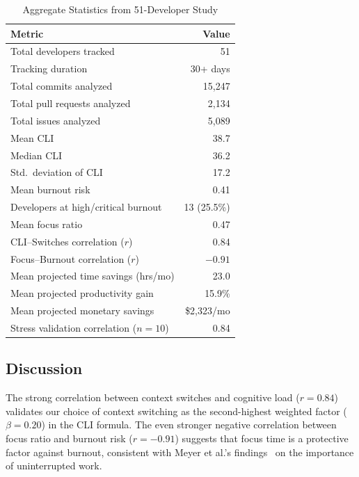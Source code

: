\documentclass[12pt]{article}
\begin{document}
\begin{table}[H]
\centering
\caption{Aggregate Statistics from 51-Developer Study}
\label{tab:aggregate}
\begin{tabular}{@{}lr@{}}
\toprule
\textbf{Metric} & \textbf{Value} \\
\midrule
Total developers tracked              & 51 \\
Tracking duration                     & 30+ days \\
Total commits analyzed                & 15,247 \\
Total pull requests analyzed          & 2,134 \\
Total issues analyzed                 & 5,089 \\
Mean CLI                              & 38.7 \\
Median CLI                            & 36.2 \\
Std.\ deviation of CLI                & 17.2 \\
Mean burnout risk                     & 0.41 \\
Developers at high/critical burnout   & 13 (25.5\%) \\
Mean focus ratio                      & 0.47 \\
CLI--Switches correlation ($r$)       & 0.84 \\
Focus--Burnout correlation ($r$)      & $-0.91$ \\
Mean projected time savings (hrs/mo)  & 23.0 \\
Mean projected productivity gain      & 15.9\% \\
Mean projected monetary savings       & \$2,323/mo \\
Stress validation correlation ($n=10$) & 0.84 \\
\bottomrule
\end{tabular}
\end{table}

\subsection{Discussion}

The strong correlation between context switches and cognitive load ($r = 0.84$) validates our choice of context switching as the second-highest weighted factor ($\beta = 0.20$) in the CLI formula. The even stronger negative correlation between focus ratio and burnout risk ($r = -0.91$) suggests that focus time is a protective factor against burnout, consistent with Meyer et al.'s findings~\cite{meyer2019today} on the importance of uninterrupted work.
\end{document}
